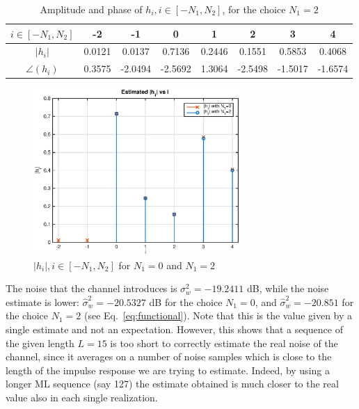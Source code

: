 \documentclass[10pt]{article}
\begin{document}
\begin{table}[h!]
	\centering
	\begin{tabular}{c|c|c|c|c|c|c|c}
		$i \in [-N_1, N_2]$ & -2 & -1 & 0 & 1 & 2 & 3 & 4 \\ \hline
		$|h_i|$ 	&	0.0121  &  0.0137  &  0.7136   & 0.2446  &  0.1551  &  0.5853  &  0.4068 \\
		$\angle(h_i)$ &	0.3575  & -2.0494  & -2.5692   & 1.3064  & -2.5498  & -1.5017  & -1.6574 \\
	\end{tabular}
	\caption{Amplitude and phase of $h_i, i \in [-N_1, N_2]$, for the choice $N_1 = 2$}
	\label{table:h2}
\end{table}

\begin{figure}[h!]
 \centering
 \includegraphics[width = 0.7\textwidth]{hi_p1}
 \caption{$|h_i|, i \in [-N_1, N_2]$ for $N_1 = 0$ and $N_1 = 2$}
 \label{fig:hi_p1}
\end{figure}

The noise that the channel introduces is $\sigma_w^2 = -19.2411$ dB, while the noise estimate is lower: $\hat{\sigma}_w^2 = -20.5327$ dB for the choice $N_1 = 0$, and $\hat{\sigma}_w^2 = -20.851$ for the choice $N_1 = 2$ (see Eq.~\ref{eq:functional}). Note that this is the value given by a single estimate and not an expectation. However, this shows that a sequence of the given length $L = 15$ is too short to correctly estimate the real noise of the channel, since it averages on a number of noise samples which is close to the length of the impulse response we are trying to estimate. Indeed, by using a longer ML sequence (say 127) the estimate obtained is much closer to the real value also in each single realization. 
\end{document}
